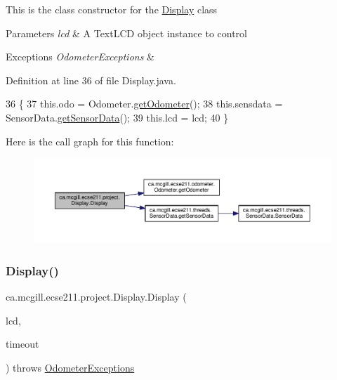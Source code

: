This is the class constructor for the \hyperlink{classca_1_1mcgill_1_1ecse211_1_1project_1_1_display}{Display} class


\begin{DoxyParams}{Parameters}
{\em lcd} & A Text\+L\+CD object instance to control \\
\hline
\end{DoxyParams}

\begin{DoxyExceptions}{Exceptions}
{\em Odometer\+Exceptions} & \\
\hline
\end{DoxyExceptions}


Definition at line 36 of file Display.\+java.


\begin{DoxyCode}
36                                                         \{
37     this.odo = Odometer.\hyperlink{classca_1_1mcgill_1_1ecse211_1_1odometer_1_1_odometer_a99171f11e34dea918fa9dd069d721439}{getOdometer}();
38     this.sensdata = SensorData.\hyperlink{classca_1_1mcgill_1_1ecse211_1_1threads_1_1_sensor_data_a8260aba53b4474ca1275e4ce26157977}{getSensorData}();
39     this.lcd = lcd;
40   \}
\end{DoxyCode}
Here is the call graph for this function\+:\nopagebreak
\begin{figure}[H]
\begin{center}
\leavevmode
\includegraphics[width=350pt]{classca_1_1mcgill_1_1ecse211_1_1project_1_1_display_af0970123ca090749bfb2f5b9f478c01d_cgraph}
\end{center}
\end{figure}
\mbox{\label{classca_1_1mcgill_1_1ecse211_1_1project_1_1_display_a690cd91bcc8024950c2b8e3b2613c801}} 
\subsubsection{\texorpdfstring{Display()}{Display()}\hspace{0.1cm}{\footnotesize\ttfamily [2/2]}}
{\footnotesize\ttfamily ca.\+mcgill.\+ecse211.\+project.\+Display.\+Display (\begin{DoxyParamCaption}\item[{Text\+L\+CD}]{lcd,  }\item[{long}]{timeout }\end{DoxyParamCaption}) throws \hyperlink{classca_1_1mcgill_1_1ecse211_1_1odometer_1_1_odometer_exceptions}{Odometer\+Exceptions}}

